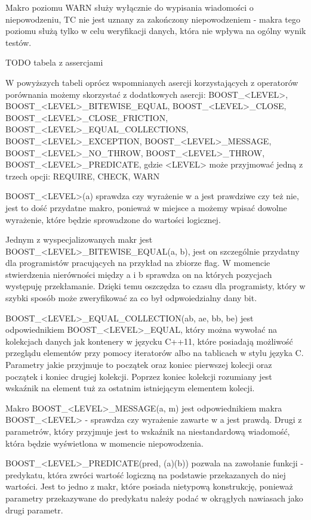 \documentclass[12pt,a4paper,notitlepage]{report}
\begin{document}
Makro poziomu WARN służy wyłącznie do wypisania wiadomości o niepowodzeniu, TC nie jest uznany za zakończony niepowodzeniem - makra tego poziomu służą tylko w celu weryfikacji danych, która nie wpływa na ogólny wynik testów.

TODO tabela z assercjami

W powyższych tabeli oprócz wspomnianych asercji korzystających z operatorów porównania możemy skorzystać z dodatkowych asercji: BOOST{\_}<LEVEL>, BOOST{\_}<LEVEL>{\_}BITEWISE{\_}EQUAL, BOOST{\_}<LEVEL>{\_}CLOSE, BOOST{\_}<LEVEL>{\_}CLOSE{\_}FRICTION, BOOST{\_}<LEVEL>{\_}EQUAL{\_}COLLECTIONS, BOOST{\_}<LEVEL>{\_}EXCEPTION, BOOST{\_}<LEVEL>{\_}MESSAGE, BOOST{\_}<LEVEL>{\_}NO{\_}THROW, BOOST{\_}<LEVEL>{\_}THROW, BOOST{\_}<LEVEL>{\_}PREDICATE, gdzie <LEVEL> może przyjmować jedną z trzech opcji: REQUIRE, CHECK, WARN

BOOST{\_}<LEVEL>(a) sprawdza czy wyrażenie w a jest prawdziwe czy też nie, jest to dość przydatne makro, ponieważ w miejsce a możemy wpisać dowolne wyrażenie, które będzie sprowadzone do wartości logicznej.

Jednym z wyspecjalizowanych makr jest BOOST{\_}<LEVEL>{\_}BITEWISE{\_}EQUAL(a, b), jest on szczególnie przydatny dla programistów pracujących na przykład na zbiorze flag. W momencie stwierdzenia nierówności między a i b sprawdza on na których pozycjach występuję przekłamanie. Dzięki temu oszczędza to czasu dla programisty, który w szybki sposób może zweryfikować za co był odpwoiedzialny dany bit.

BOOST{\_}<LEVEL>{\_}EQUAL{\_}COLLECTION(ab, ae, bb, be) jest odpowiednikiem BOOST{\_}<LEVEL>{\_}EQUAL, który można wywołać na kolekcjach danych jak kontenery w języcku C++11, które posiadają możliwość przeglądu elementów przy pomocy iteratorów albo na tablicach w stylu języka C. Parametry jakie przyjmuje to początek oraz koniec pierwszej kolecji oraz początek i koniec drugiej kolekcji. Poprzez koniec kolekcji rozumiany jest wskaźnik na element tuż za ostatnim istniejącym elementem kolecji.

Makro BOOST{\_}<LEVEL>{\_}MESSAGE(a, m) jest odpowiednikiem makra BOOST{\_}<LEVEL> - sprawdza czy wyrażenie zawarte w a jest prawdą. Drugi z parametrów, który przyjmuje jest to wskaźnik na niestandardową wiadomość, która będzie wyświetlona w momencie niepowodzenia.

BOOST{\_}<LEVEL>{\_}PREDICATE(pred, (a)(b)) pozwala na zawołanie funkcji - predykatu, która zwróci wartość logiczną na podstawie przekazanych do niej wartości. Jest to jedno z makr, które posiada nietypową konstrukcję, ponieważ parametry przekazywane do predykatu należy podać w okrągłych nawiasach jako drugi parametr.
\end{document}
